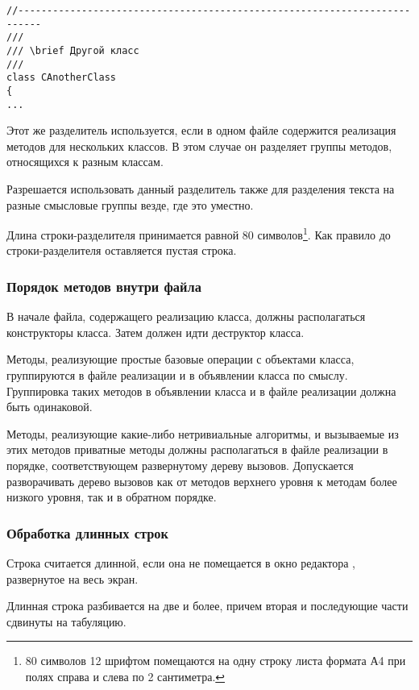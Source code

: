 {{{\begin{lstlisting}[frame=single,numbers=none]
//--------------------------------------------------------------------------
///
/// \brief Другой класс
///
class CAnotherClass
{
...
\end{lstlisting}

Этот же разделитель используется, если в одном файле содержится реализация методов для нескольких классов. В этом случае он разделяет группы методов, относящихся к разным классам.

Разрешается использовать данный разделитель также для разделения текста на разные смысловые группы везде, где это уместно. 

Длина строки-разделителя принимается равной 80 символов\footnote[1]{80 символов 12 шрифтом помещаются на одну строку листа формата А4 при полях справа и слева по 2 сантиметра.}. Как правило до строки-разделителя оставляется пустая строка.

\subsubsection{Порядок методов внутри файла}

В начале файла, содержащего реализацию класса, должны располагаться конструкторы класса. Затем должен идти деструктор класса.

Методы, реализующие простые базовые операции с объектами класса, группируются в файле реализации и в объявлении класса по смыслу. Группировка таких методов в объявлении класса и в файле реализации должна быть одинаковой.

Методы, реализующие какие-либо нетривиальные алгоритмы, и вызываемые из этих методов приватные методы должны располагаться в файле реализации в порядке, соответствующем развернутому дереву вызовов. Допускается разворачивать дерево вызовов как от методов верхнего уровня к методам более низкого уровня, так и в обратном порядке.

\newpage
\subsubsection{Обработка длинных строк}

Строка считается длинной, если она не помещается в окно редактора , развернутое на весь экран. 

Длинная строка разбивается на две и более, причем вторая и последующие части сдвинуты на табуляцию.

}}}
